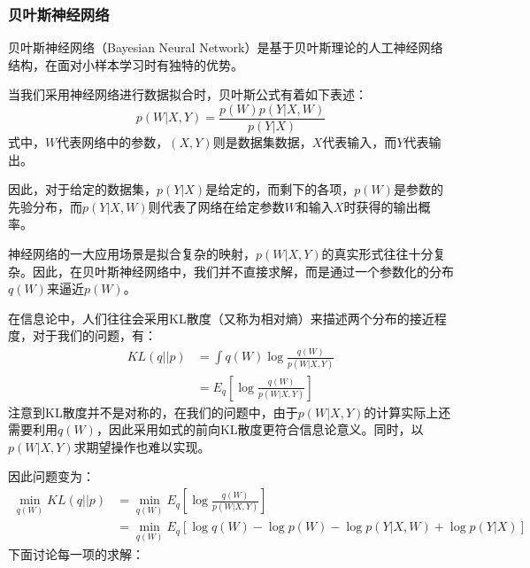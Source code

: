 \documentclass[aps,pre,12pt,preprint,onecolumn,showpacs,showkeys]{revtex4-1}
\begin{document}
\subsubsection{贝叶斯神经网络}
贝叶斯神经网络（Bayesian Neural Network）是基于贝叶斯理论的人工神经网络结构，在面对小样本学习时有独特的优势。\par
当我们采用神经网络进行数据拟合时，贝叶斯公式有着如下表述：
\begin{equation}
    p(W | X, Y)=\frac{p(W) p(Y | X, W)}{p(Y | X)}
\end{equation}
式中，$W$代表网络中的参数，$(X,Y)$则是数据集数据，$X$代表输入，而$Y$代表输出。\par
因此，对于给定的数据集，$p(Y|X)$是给定的，而剩下的各项，$p(W)$是参数的先验分布，而$p(Y|X,W)$则代表了网络在给定参数$W$和输入$X$时获得的输出概率。\par
神经网络的一大应用场景是拟合复杂的映射，$p(W|X,Y)$的真实形式往往十分复杂。因此，在贝叶斯神经网络中，我们并不直接求解，而是通过一个参数化的分布
$q(W)$来逼近$p(W)$。\par
在信息论中，人们往往会采用KL散度（又称为相对熵）来描述两个分布的接近程度，对于我们的问题，有：
\begin{equation}
    \begin{aligned}
    KL(q||p)&=\int q(W)\log{\frac{q(W)}{p(W|X,Y)}}\\
    &=E_q[\log{\frac{q(W)}{p(W|X,Y)}}]
    \end{aligned}
\end{equation}
注意到KL散度并不是对称的，在我们的问题中，由于$p(W|X,Y)$的计算实际上还需要利用$q(W)$，因此采用如式的前向KL散度更符合信息论意义。同时，以$p(W|X,Y)$求期望操作也难以实现。\par
因此问题变为：
\begin{equation}
    \begin{aligned}
        \min_{q(W)}KL(q||p)&=\min_{q(W)}E_q[\log{\frac{q(W)}{p(W|X,Y)}}]\\
        &=\min_{q(W)}E_{q}[\log q(W)-\log p(W)-\log p(Y | X, W)+\log p(Y | X)]
        \end{aligned}
\end{equation}
下面讨论每一项的求解：
\end{document}

